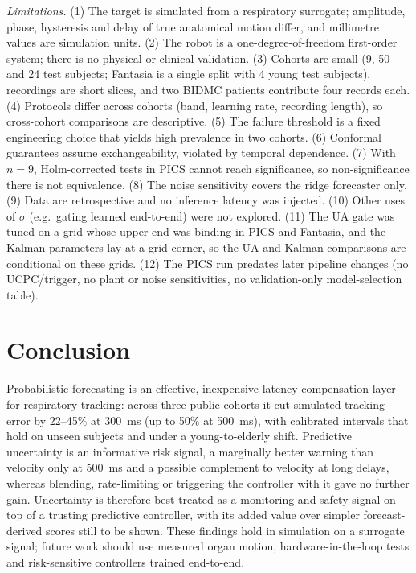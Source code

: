 \documentclass[conference]{IEEEtran}
\begin{document}
\emph{Limitations.} (1) The target is simulated from a respiratory surrogate; amplitude, phase, hysteresis and delay of true anatomical motion differ, and millimetre values are simulation units. (2) The robot is a one-degree-of-freedom first-order system; there is no physical or clinical validation. (3) Cohorts are small (9, 50 and 24 test subjects; Fantasia is a single split with 4 young test subjects), recordings are short slices, and two BIDMC patients contribute four records each. (4) Protocols differ across cohorts (band, learning rate, recording length), so cross-cohort comparisons are descriptive. (5) The failure threshold is a fixed engineering choice that yields high prevalence in two cohorts. (6) Conformal guarantees assume exchangeability, violated by temporal dependence. (7) With $n=9$, Holm-corrected tests in PICS cannot reach significance, so non-significance there is not equivalence. (8) The noise sensitivity covers the ridge forecaster only. (9) Data are retrospective and no inference latency was injected. (10) Other uses of $\sigma$ (e.g.\ gating learned end-to-end) were not explored. (11) The UA gate was tuned on a grid whose upper end was binding in PICS and Fantasia, and the Kalman parameters lay at a grid corner, so the UA and Kalman comparisons are conditional on these grids. (12) The PICS run predates later pipeline changes (no UCPC/trigger, no plant or noise sensitivities, no validation-only model-selection table).

\section{Conclusion}
Probabilistic forecasting is an effective, inexpensive latency-compensation layer for respiratory tracking: across three public cohorts it cut simulated tracking error by 22--45\% at 300~ms (up to 50\% at 500~ms), with calibrated intervals that hold on unseen subjects and under a young-to-elderly shift. Predictive uncertainty is an informative risk signal, a marginally better warning than velocity only at 500~ms and a possible complement to velocity at long delays, whereas blending, rate-limiting or triggering the controller with it gave no further gain. Uncertainty is therefore best treated as a monitoring and safety signal on top of a trusting predictive controller, with its added value over simpler forecast-derived scores still to be shown. These findings hold in simulation on a surrogate signal; future work should use measured organ motion, hardware-in-the-loop tests and risk-sensitive controllers trained end-to-end.
\end{document}
